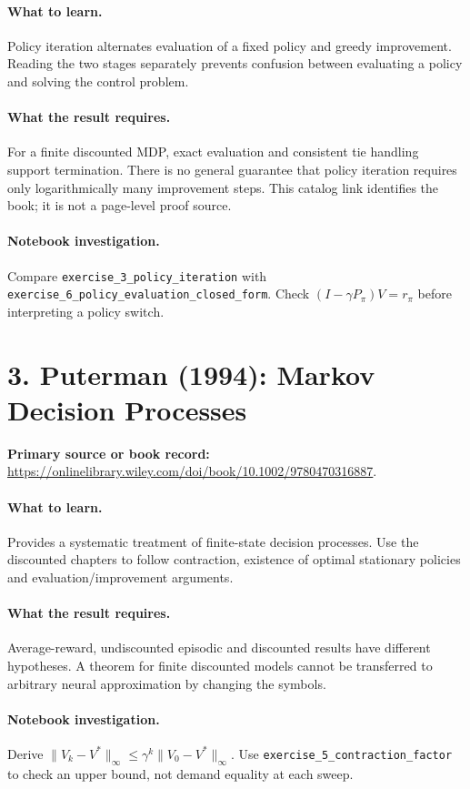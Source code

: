 \documentclass[11pt]{scrartcl}
\begin{document}
\paragraph{What to learn.} Policy iteration alternates evaluation of a fixed policy and greedy improvement. Reading the two stages separately prevents confusion between evaluating a policy and solving the control problem.

\paragraph{What the result requires.} For a finite discounted MDP, exact evaluation and consistent tie handling support termination. There is no general guarantee that policy iteration requires only logarithmically many improvement steps. This catalog link identifies the book; it is not a page-level proof source.

\paragraph{Notebook investigation.} Compare \texttt{exercise\_3\_policy\_iteration} with \texttt{exercise\_6\_policy\_evaluation\_closed\_form}. Check $(I-\gamma P_\pi)V=r_\pi$ before interpreting a policy switch.

\section*{3. Puterman (1994): Markov Decision Processes}
\textbf{Primary source or book record:} \url{https://onlinelibrary.wiley.com/doi/book/10.1002/9780470316887}.

\paragraph{What to learn.} Provides a systematic treatment of finite-state decision processes. Use the discounted chapters to follow contraction, existence of optimal stationary policies and evaluation/improvement arguments.

\paragraph{What the result requires.} Average-reward, undiscounted episodic and discounted results have different hypotheses. A theorem for finite discounted models cannot be transferred to arbitrary neural approximation by changing the symbols.

\paragraph{Notebook investigation.} Derive $\|V_k-V^*\|_\infty\le\gamma^k\|V_0-V^*\|_\infty$. Use \texttt{exercise\_5\_contraction\_factor} to check an upper bound, not demand equality at each sweep.
\end{document}
